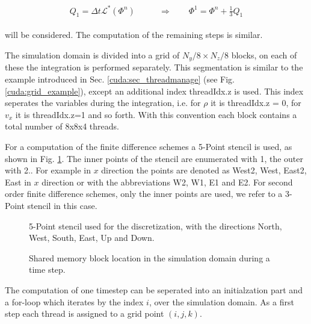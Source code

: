 \begin{align}
    \begin{split}
    Q_1 = \Delta t \mathcal{L}^*\left(\Phi^n\right)\qquad &\Rightarrow \qquad \Phi^{1} = \Phi^n + \frac{1}{3}Q_1
    \end{split}
\end{align}

will be considered.  The computation of the remaining steps is similar.


The simulation domain is divided into a grid of  $N_y/8 \times N_z/8$ blocks, on each of these the integration is performed separately.
This segmentation is similar to the example introduced in Sec. \ref{cuda:sec_threadmanage} (see Fig. \ref{cuda:grid_example}), except an
additional index threadIdx.z is used.
This index seperates the variables during the integration, i.e. for $\rho$ it is threadIdx.z = 0, for $v_x$  it is threadIdx.z=1 and so forth.
With this convention each block contains a total number of 8x8x4 threads.

For a computation of the finite difference schemes  a 5-Point stencil is used, as shown in Fig. \ref{cuda:stencil}.
The inner points of the stencil are enumerated with 1, the outer with 2.. For example in $x$ direction the points are denoted as West2,
West, East2, East in $x$ direction or with the abbreviations W2, W1, E1 and E2.
For second order finite difference schemes, only the inner points  are used, we refer to a 3-Point stencil in this case.

\begin{figure}[!bp]
      \centering
        \caption{
            5-Point stencil used for the discretization, with the directions North, West, South, East, Up and Down.
        }
       \label{cuda:stencil}
\end{figure}

\begin{figure}[!bp]
      \centering
       \caption{
           Shared memory block location in the simulation domain during a time step.
       }
       \label{cuda:timestep_algo_img}
\end{figure}
\clearpage

The computation of one timestep can be seperated into an initialzation part and a for-loop which iterates by the index $i$, over the simulation domain.
As a first step each thread is assigned to a grid point $(i, j, k)$.

